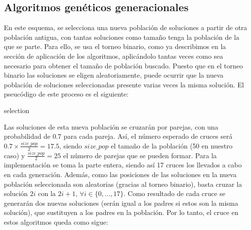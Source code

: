 \documentclass[10pt,a4paper]{article}
\begin{document}
\subsection{Algoritmos genéticos generacionales}

En este esquema, se selecciona una nueva población de soluciones a partir de otra población antigua, con tantas soluciones como tamaño tenga la población de la que se parte. Para ello, se usa el torneo binario, como ya describimos en la sección de aplicación de los algoritmos, aplicándolo tantas veces como sea necesario para obtener el tamaño de población buscado. Puesto que en el torneo binario las soluciones se eligen aleatoriamente, puede ocurrir que la nueva población de soluciones seleccionadas presente varias veces la misma solución.  El pseucódigo de este proceso es el siguiente:

	
\begin{algorithm}[H]
	\DontPrintSemicolon
	\caption{{\sc selection} }
\end{algorithm}

Las soluciones de esta nueva población se cruzarán por parejas, con una probabilidad de $0.7$ para cada pareja. Así, el número esperado de cruces será $0.7\times \frac{size\_pop}{2}=17.5$, siendo $size\_pop$ el tamaño de la población (50 en nuestro caso) y $\frac{size\_pop}{2}=25$ el número de parejas que se pueden formar. Para la implementación se toma la parte entera, siendo así 17 cruces los llevados a cabo en cada generación. Además, como las posiciones de las soluciones en la nueva población seleccionada son aleatorias (gracias al torneo binario), basta cruzar la solución $2i$ con la $2i+1$, $\forall i \in \{0,...,17\}$. Como resultado de cada cruce se generarán dos nuevas soluciones (serán igual a los padres si estos son la misma solución), que sustituyen a los padres en la población. Por lo tanto, el cruce en estos algoritmos queda como sigue:
\end{document}
